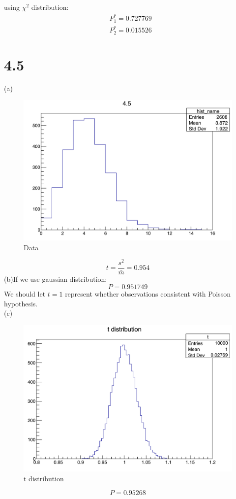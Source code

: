 \documentclass{article}
\begin{document}
\begin{CJK*}{GBK}{song}
using $\chi^2$ distribution:
\begin{equation}
\begin{aligned}
&P_1^*=0.727769\\
&P_2^*=0.015526
\end{aligned}
\end{equation}


\section{4.5}
(a)
\begin{figure}[H]
\centerline{\includegraphics[scale=0.4]{4.5a.png}}
\caption{Data}
\label{fig:label}
\end{figure}
\begin{equation}
t=\frac{s^2}{\bar{m}}=0.954
\end{equation}
(b)If we use gaussian distribution:
\begin{equation}
P=0.951749
\end{equation}
We should let $t=1$ represent whether observations consistent with Poisson hypothesis.\\
(c)
\begin{figure}[H]
\centerline{\includegraphics[scale=0.4]{4.5c.png}}
\caption{t distribution}
\label{fig:label}
\end{figure}

\begin{equation}
P=0.95268
\end{equation}






\end{CJK*}
\end{document}
